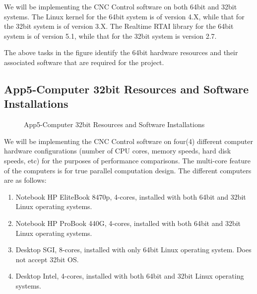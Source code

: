 We will be implementing the CNC Control software on both 64bit and 32bit systems. The Linux kernel for the 64bit system is of version 4.X, while that for the 32bit system is of version 3.X. The Realtime RTAI library for the 64bit system is of version 5.1, while that for the 32bit system is version 2.7.  
\vspace{0.5cm}

The above tasks in the figure identify the 64bit hardware resources and their associated software that are required for the project.

\pagebreak
\subsection{App5-Computer 32bit Resources and Software Installations}
\begin{figure}[htbp]
	\begin{center}
		\caption{App5-Computer 32bit Resources and Software Installations}
		\label{fig:App5-04-Research-Implementation-Plan.png}
	\end{center}
\end{figure}

We will be implementing the CNC Control software on four(4) different computer hardware configurations (number of CPU cores, memory speeds, hard disk speeds, etc) for the purposes of performance comparisons. The multi-core feature of the computers is for true parallel computation design. The different computers are as follows:

\begin{enumerate}
	\item Notebook HP EliteBook 8470p, 4-cores, installed with both 64bit and 32bit Linux operating systems.   
	
	\item Notebook HP ProBook 440G, 4-cores, installed with both 64bit and 32bit Linux operating systems.
	
	\item Desktop SGI, 8-cores, installed with only 64bit Linux operating system. Does not accept 32bit OS.
	
	\item Desktop Intel, 4-cores, installed with both 64bit and 32bit Linux operating systems.
\end{enumerate}

